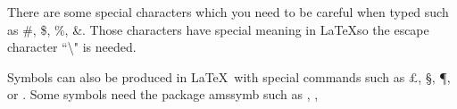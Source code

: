 \documentclass[a4paper, 12pt]{article}
\begin{document}
	There are some special characters which you need to be careful when typed such as \#, \$, \%, \&. Those characters have special meaning in \LaTeX so the escape character ``\textbackslash" is needed.
	
	Symbols can also be produced in \LaTeX\ with special commands such as \pounds, \S, \P, \dag or \ddag. Some symbols need the package amssymb such as \checkmark, \maltese, \yen
\end{document}

